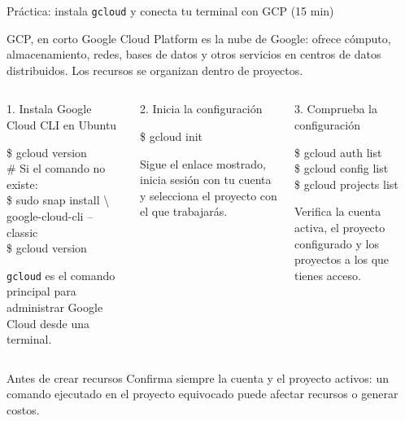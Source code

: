 \documentclass[aspectratio=169,10pt,c]{beamer}
\begin{document}
\begin{frame}{Práctica: instala \texttt{gcloud} y conecta tu terminal con GCP \textnormal{\small(15 min)}}
\begin{block}{GCP, en corto}
\small Google Cloud Platform es la nube de Google: ofrece cómputo, almacenamiento, redes, bases de datos y otros servicios en centros de datos distribuidos. Los recursos se organizan dentro de proyectos.
\end{block}
\begin{columns}[T,onlytextwidth]
\begin{exampleblock}{1. Instala Google Cloud CLI en Ubuntu}
\begin{terminal}\footnotesize
\$ gcloud version\\
\# Si el comando no existe:\\
\$ sudo snap install \textbackslash\\
\quad google-cloud-cli --classic\\
\$ gcloud version
\end{terminal}
\footnotesize \texttt{gcloud} es el comando principal para administrar Google Cloud desde una terminal.
\end{exampleblock}
\begin{exampleblock}{2. Inicia la configuración}
\begin{terminal}\footnotesize
\$ gcloud init
\end{terminal}
\footnotesize Sigue el enlace mostrado, inicia sesión con tu cuenta y selecciona el proyecto con el que trabajarás.
\end{exampleblock}
\begin{exampleblock}{3. Comprueba la configuración}
\begin{terminal}\footnotesize
\$ gcloud auth list\\
\$ gcloud config list\\
\$ gcloud projects list
\end{terminal}
\footnotesize Verifica la cuenta activa, el proyecto configurado y los proyectos a los que tienes acceso.
\end{exampleblock}
\end{columns}
\begin{alertblock}{Antes de crear recursos}
\footnotesize Confirma siempre la cuenta y el proyecto activos: un comando ejecutado en el proyecto equivocado puede afectar recursos o generar costos.
\end{alertblock}
\end{frame}
\end{document}
